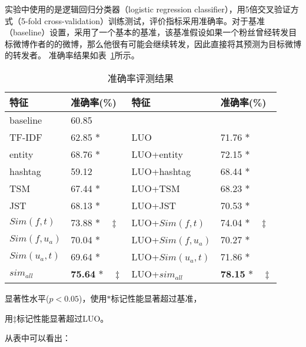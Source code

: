 实验中使用的是逻辑回归分类器（logistic regression classifier），用5倍交叉验证方式（5-fold cross-validation）训练测试，评价指标采用准确率。对于基准（baseline）设置，采用了一个基本的基准，该基准假设如果一个粉丝曾经转发目标微博作者的的微博，那么他很有可能会继续转发，因此直接将其预测为目标微博的转发者。
准确率结果如表~\ref{tab6-6}所示。

\begin{table}[htb]
\centering
\caption{准确率评测结果}
\label{tab6-6}
\begin{tabular}{|l|l|l|l|}
\hline
特征 &准确率(\%) & 特征 &准确率(\%)\\
\hline
baseline & 60.85 & & \\
\hline
TF-IDF & 62.85   $\ast$ & LUO & 71.76 $ \ast  $\\
entity & 68.76  $\ast$ & LUO+entity & 72.15 $\ast$\\
hashtag & 59.12  & LUO+hashtag & 68.44 $\ast$\\
\hline
TSM & 67.44 $\ast$ & LUO+TSM & 68.23 $\ast$\\
JST & 68.13 $\ast$ & LUO+JST & 70.53 $\ast$\\
\hline
$ Sim(f,t) $ & 73.88   $\ast  \quad \ddagger $ &LUO+$ Sim(f,t)$ & 74.04  $ \ast \quad \ddagger $\\
$ Sim(f,u_a)  $ & 70.04   $\ast  $ & LUO+$ Sim(f,u_a)$ & 70.27  $ \ast $\\
$ Sim(u_a,t)  $ & 69.64   $\ast  $ & LUO+$ Sim(u_a,t)$ & 71.86  $ \ast $\\
$ sim_{all}  $ & \textbf{75.64}   $\ast \quad \ddagger $ & LUO+$ sim_{all}  $ & \textbf{78.15}  $ \ast \quad \ddagger $\\
\hline
\end{tabular}
\begin{tablenotes}
  \centering
  \footnotesize
\item 显著性水平($p < 0.05$)，使用$ \ast $标记性能显著超过基准，\\
\item 用$ \ddagger $标记性能显著超过LUO。
\end{tablenotes}
\end{table}
从表中可以看出：

